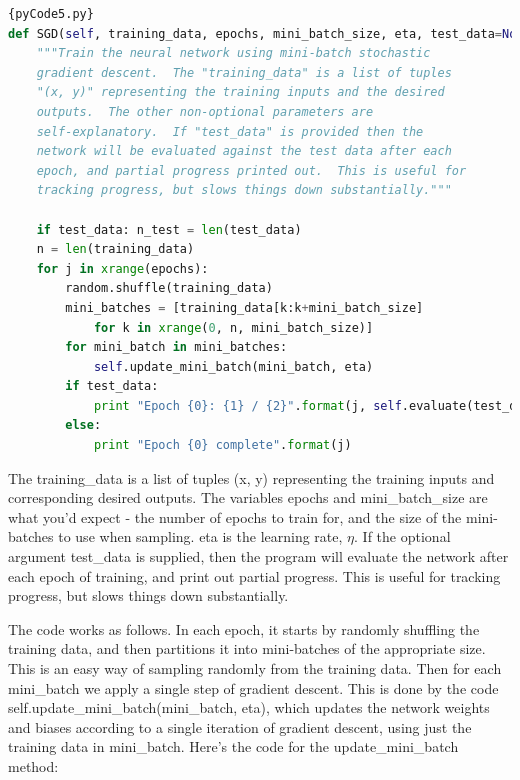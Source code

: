 \documentclass[a4paper,12pt]{report}%
\begin{document}
\begin{lstlisting}[language=Python,breaklines,basicstyle=\footnotesize\ttfamily]{pyCode5.py}
def SGD(self, training_data, epochs, mini_batch_size, eta, test_data=None):
    """Train the neural network using mini-batch stochastic
    gradient descent.  The "training_data" is a list of tuples
    "(x, y)" representing the training inputs and the desired
    outputs.  The other non-optional parameters are
    self-explanatory.  If "test_data" is provided then the
    network will be evaluated against the test data after each
    epoch, and partial progress printed out.  This is useful for
    tracking progress, but slows things down substantially."""

    if test_data: n_test = len(test_data)
    n = len(training_data)
    for j in xrange(epochs):
        random.shuffle(training_data)
        mini_batches = [training_data[k:k+mini_batch_size]
            for k in xrange(0, n, mini_batch_size)]
        for mini_batch in mini_batches:
            self.update_mini_batch(mini_batch, eta)
        if test_data:
            print "Epoch {0}: {1} / {2}".format(j, self.evaluate(test_data), n_test)
        else:
            print "Epoch {0} complete".format(j)
\end{lstlisting}

The training\_data is a list of tuples (x, y) representing the training inputs and corresponding desired outputs. The variables epochs and mini\_batch\_size are what you'd expect - the number of epochs to train for, and the size of the mini-batches to use when sampling. eta is the learning rate, $\eta$. If the optional argument test\_data is supplied, then the program will evaluate the network after each epoch of training, and print out partial progress. This is useful for tracking progress, but slows things down substantially.

The code works as follows. In each epoch, it starts by randomly shuffling the training data, and then partitions it into mini-batches of the appropriate size. This is an easy way of sampling randomly from the training data. Then for each mini\_batch we apply a single step of gradient descent. This is done by the code self.update\_mini\_batch(mini\_batch, eta), which updates the network weights and biases according to a single iteration of gradient descent, using just the training data in mini\_batch. Here's the code for the update\_mini\_batch method:
\end{document}
